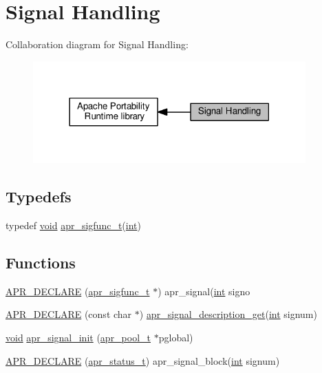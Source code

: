 \hypertarget{group__apr__signal}{}\section{Signal Handling}
\label{group__apr__signal}
Collaboration diagram for Signal Handling\+:
\nopagebreak
\begin{figure}[H]
\begin{center}
\leavevmode
\includegraphics[width=297pt]{group__apr__signal}
\end{center}
\end{figure}
\subsection*{Typedefs}
\begin{DoxyCompactItemize}
\item 
typedef \hyperlink{group__MOD__ISAPI_gacd6cdbf73df3d9eed42fa493d9b621a6}{void} \hyperlink{group__apr__signal_ga2afd99d29d57dc1358aeccedb714368a}{apr\+\_\+sigfunc\+\_\+t}(\hyperlink{pcre_8txt_a42dfa4ff673c82d8efe7144098fbc198}{int})
\end{DoxyCompactItemize}
\subsection*{Functions}
\begin{DoxyCompactItemize}
\item 
\hyperlink{group__apr__signal_ga921fe55312582f00313328c36f1a9cb1}{A\+P\+R\+\_\+\+D\+E\+C\+L\+A\+RE} (\hyperlink{group__apr__signal_ga2afd99d29d57dc1358aeccedb714368a}{apr\+\_\+sigfunc\+\_\+t} $\ast$) apr\+\_\+signal(\hyperlink{pcre_8txt_a42dfa4ff673c82d8efe7144098fbc198}{int} signo
\item 
\hyperlink{group__apr__signal_gaed88b5cf42dcc966a95840f0575380bc}{A\+P\+R\+\_\+\+D\+E\+C\+L\+A\+RE} (const char $\ast$) \hyperlink{unix_2signals_8c_a685b8a8e5e7a5067e3fe3456c5c1a150}{apr\+\_\+signal\+\_\+description\+\_\+get}(\hyperlink{pcre_8txt_a42dfa4ff673c82d8efe7144098fbc198}{int} signum)
\item 
\hyperlink{group__MOD__ISAPI_gacd6cdbf73df3d9eed42fa493d9b621a6}{void} \hyperlink{group__apr__signal_ga76f1701a2f33697425b3fa6fa44a192b}{apr\+\_\+signal\+\_\+init} (\hyperlink{structapr__pool__t}{apr\+\_\+pool\+\_\+t} $\ast$pglobal)
\item 
\hyperlink{group__apr__signal_ga907565140ae0dda6f562a679e6519e67}{A\+P\+R\+\_\+\+D\+E\+C\+L\+A\+RE} (\hyperlink{group__apr__errno_gaa5105fa83cc322f09382292db8b47593}{apr\+\_\+status\+\_\+t}) apr\+\_\+signal\+\_\+block(\hyperlink{pcre_8txt_a42dfa4ff673c82d8efe7144098fbc198}{int} signum)
\end{DoxyCompactItemize}
